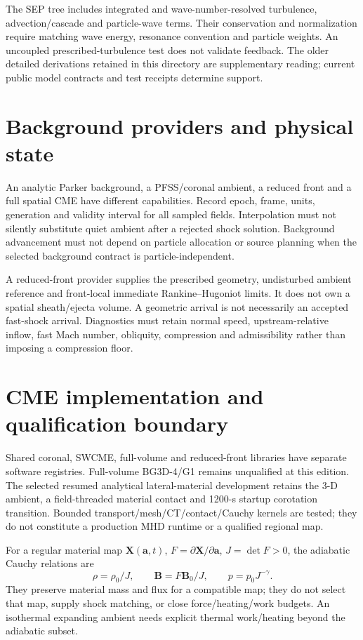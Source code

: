 The SEP tree includes integrated and wave-number-resolved turbulence,
advection/cascade and particle-wave terms. Their conservation and
normalization require matching wave energy, resonance convention and particle
weights. An uncoupled prescribed-turbulence test does not validate feedback.
The older detailed derivations retained in this directory are supplementary
reading; current public model contracts and test receipts determine support.

\section{Background providers and physical state}
An analytic Parker background, a PFSS/coronal ambient, a reduced front and
a full spatial CME have different capabilities. Record epoch, frame,
units, generation and validity interval for all sampled fields. Interpolation
must not silently substitute quiet ambient after a rejected shock solution.
Background advancement must not depend on particle allocation or source
planning when the selected background contract is particle-independent.

A reduced-front provider supplies the prescribed geometry, undisturbed
ambient reference and front-local immediate Rankine--Hugoniot limits.
It does not own a spatial sheath/ejecta volume. A geometric arrival is not
necessarily an accepted fast-shock arrival. Diagnostics must retain normal
speed, upstream-relative inflow, fast Mach number, obliquity, compression
and admissibility rather than imposing a compression floor.

\section{CME implementation and qualification boundary}
Shared coronal, SWCME, full-volume and reduced-front libraries have separate
software registries. Full-volume BG3D-4/G1 remains unqualified at this edition.
The selected resumed analytical lateral-material development retains the
3-D ambient, a field-threaded material contact and 1200-s startup corotation
transition. Bounded transport/mesh/CT/contact/Cauchy kernels are tested;
they do not constitute a production MHD runtime or a qualified regional map.

For a regular material map $\boldsymbol X(\boldsymbol a,t)$,
$F=\partial\boldsymbol X/\partial\boldsymbol a$, $J=\det F>0$, the adiabatic
Cauchy relations are
\begin{equation}
\rho=\rho_0/J,\qquad
\boldsymbol B=F\boldsymbol B_0/J,\qquad p=p_0J^{-\gamma}.
\end{equation}
They preserve material mass and flux for a compatible map; they do not select
that map, supply shock matching, or close force/heating/work budgets.
An isothermal expanding ambient needs explicit thermal work/heating beyond
the adiabatic subset.

